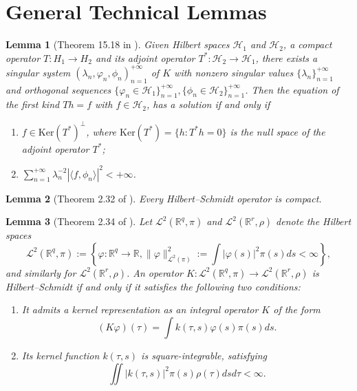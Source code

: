 \documentclass[
  12pt]{article}
\newtheorem{lemma}{Lemma}
\def\to{\rightarrow}
\def\mR{\mathbb{R}}
\def\cH{\mathcal{H}}
\def\cL{\mathcal{L}}
\begin{document}
\section{General Technical Lemmas}
\begin{lemma}[Theorem 15.18 in \cite{kress1989linear}]\label{lemma.Picard}
    Given Hilbert spaces $\cH_1$ and $\cH_2$, a compact operator $T:H_{1}\to H_{2}$ and its adjoint operator $T^{*}:\cH_2\to \cH_1$, there exists a singular system $(\lambda_n,\varphi_n,\phi_{n})_{n=1}^{+\infty}$ of $K$ with nonzero singular values $\{\lambda_{n}\}_{n=1}^{+\infty}$ and orthogonal sequences $\{\varphi_n\in \cH_1\}_{n=1}^{+\infty}, \{\phi_{n}\in \cH_{2}\}_{n=1}^{+\infty}$. Then the equation of the first kind $Th=f$ with $f \in \cH_2$, has a solution if and only if
    \begin{enumerate}
    \item $f\in\mathrm{Ker}(T^{*})^{\perp}$, where $\mathrm{Ker}(T^{*})=\{h:T^{*}h=0\}$ is the null space of the adjoint operator $T^{*}$;
    \item $\sum_{n=1}^{+\infty}\lambda_{n}^{-2}|\langle f,\phi_{n}\rangle|^{2}<+\infty $.
    \end{enumerate} 
\end{lemma}
\begin{lemma}[Theorem 2.32 of \cite{carrasco2007linear}]\label{lem:hs-compact}
    Every Hilbert–Schmidt operator is compact.
\end{lemma}

\begin{lemma}[Theorem 2.34 of \cite{carrasco2007linear}]\label{lem:hs-kernel}
Let $\cL^2(\mR^q,\pi)$ and $\cL^2(\mR^r,\rho)$ denote the Hilbert spaces 
$$
\cL^2(\mR^q,\pi) := \left\{\varphi: \mR^q \to \mR ,\|\varphi\|_{\cL^2(\pi)}^2 := \int |\varphi(s)|^2 \pi(s) ds < \infty \right\},
$$
and similarly for $\cL^2(\mR^r,\rho)$. An operator $K: \cL^2(\mR^q,\pi) \to \cL^2(\mR^r,\rho)$ is Hilbert–Schmidt  if and only if it satisfies the following two conditions:
\begin{enumerate}
    \item It admits a kernel representation as an integral operator $K$ of the form
    $$
    (K\varphi)(\tau) = \int k(\tau, s)\varphi(s)\pi(s) ds.
    $$
    \item Its kernel function $k(\tau, s)$ is square-integrable, satisfying
    $$
    \iint |k(\tau, s)|^2 \pi(s)\rho(\tau)ds d\tau < \infty.
    $$
\end{enumerate}
\end{lemma}
\end{document}
